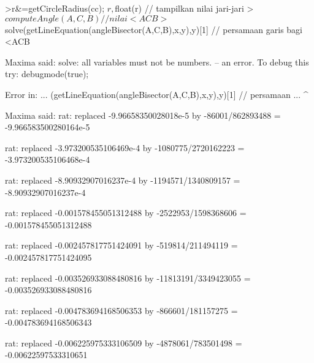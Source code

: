 \documentclass[a4paper,10pt]{article}
\begin{document}
\begin{eulernotebook}
\begin{eulercomment}
\begin{eulercomment}
\begin{eulercomment}
\begin{eulercomment}
\begin{eulercomment}
\begin{eulercomment}
\begin{eulercomment}
\begin{eulercomment}
\begin{eulercomment}
\begin{eulercomment}
\begin{eulercomment}
\begin{eulercomment}
\begin{eulercomment}
\begin{eulercomment}
\begin{eulercomment}
\begin{eulercomment}
\begin{eulerprompt}
>r&=getCircleRadius(cc); $r , $float(r) // tampilkan nilai jari-jari
>$computeAngle(A,C,B) // nilai <ACB
>$solve(getLineEquation(angleBisector(A,C,B),x,y),y)[1] // persamaan garis bagi <ACB
\end{eulerprompt}
\begin{euleroutput}
  Maxima said:
  solve: all variables must not be numbers.
   -- an error. To debug this try: debugmode(true);
  
  Error in:
  ... (getLineEquation(angleBisector(A,C,B),x,y),y)[1] // persamaan  ...
                                                       ^
\end{euleroutput}
\begin{euleroutput}
  Maxima said:
  rat: replaced -9.96658350028018e-5 by -86001/862893488 = -9.966583500280164e-5
  
  rat: replaced -3.973200535106469e-4 by -1080775/2720162223 = -3.973200535106468e-4
  
  rat: replaced -8.90932907016237e-4 by -1194571/1340809157 = -8.90932907016237e-4
  
  rat: replaced -0.001578455051312488 by -2522953/1598368606 = -0.001578455051312488
  
  rat: replaced -0.002457817751424091 by -519814/211494119 = -0.002457817751424095
  
  rat: replaced -0.003526933088480816 by -11813191/3349423055 = -0.003526933088480816
  
  rat: replaced -0.004783694168506353 by -866601/181157275 = -0.004783694168506343
  
  rat: replaced -0.006225975333106509 by -4878061/783501498 = -0.00622597533310651
  

\end{euleroutput}
\end{eulercomment}
\end{eulercomment}
\end{eulercomment}
\end{eulercomment}
\end{eulercomment}
\end{eulercomment}
\end{eulercomment}
\end{eulercomment}
\end{eulercomment}
\end{eulercomment}
\end{eulercomment}
\end{eulercomment}
\end{eulercomment}
\end{eulercomment}
\end{eulercomment}
\end{eulercomment}
\end{eulernotebook}
\end{document}
